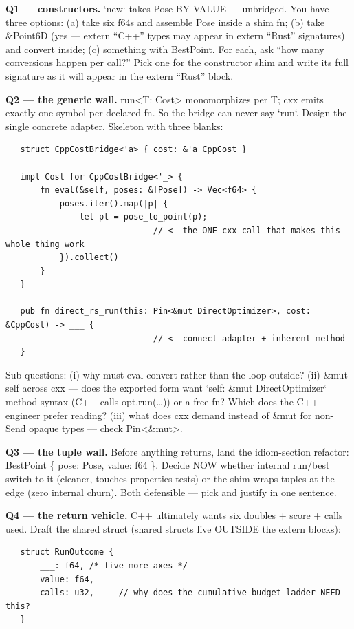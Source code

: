 \documentclass[11pt]{article}
\begin{document}
\textbf{Q1 — constructors.} `new` takes Pose BY VALUE — unbridged. You have
three options: (a) take six f64s and assemble Pose inside a shim fn;
(b) take \&Point6D (yes — extern ``C++'' types may appear in extern ``Rust''
signatures) and convert inside; (c) something with BestPoint. For each,
ask ``how many conversions happen per call?'' Pick one for the constructor
shim and write its full signature as it will appear in the extern
``Rust'' block.

\textbf{Q2 — the generic wall.} run<T: Cost> monomorphizes per T; cxx emits
exactly one symbol per declared fn. So the bridge can never say `run`.
Design the single concrete adapter. Skeleton with three blanks:

\begin{verbatim}
   struct CppCostBridge<'a> { cost: &'a CppCost }

   impl Cost for CppCostBridge<'_> {
       fn eval(&self, poses: &[Pose]) -> Vec<f64> {
           poses.iter().map(|p| {
               let pt = pose_to_point(p);
               ___            // <- the ONE cxx call that makes this whole thing work
           }).collect()
       }
   }

   pub fn direct_rs_run(this: Pin<&mut DirectOptimizer>, cost: &CppCost) -> ___ {
       ___                    // <- connect adapter + inherent method
   }
\end{verbatim}

Sub-questions: (i) why must eval convert rather than the loop outside?
(ii) \&mut self across cxx — does the exported form want `self: \&mut
DirectOptimizer` method syntax (C++ calls opt.run(\ldots{})) or a free fn?
Which does the C++ engineer prefer reading? (iii) what does cxx demand
instead of \&mut for non-Send opaque types — check Pin<\&mut>.

\textbf{Q3 — the tuple wall.} Before anything returns, land the idiom-section
refactor: BestPoint \{ pose: Pose, value: f64 \}. Decide NOW whether
internal run/best switch to it (cleaner, touches properties tests) or
the shim wraps tuples at the edge (zero internal churn). Both defensible
— pick and justify in one sentence.

\textbf{Q4 — the return vehicle.} C++ ultimately wants six doubles + score +
calls used. Draft the shared struct (shared structs live OUTSIDE the
extern blocks):

\begin{verbatim}
   struct RunOutcome {
       ___: f64, /* five more axes */
       value: f64,
       calls: u32,     // why does the cumulative-budget ladder NEED this?
   }
\end{verbatim}
\end{document}

